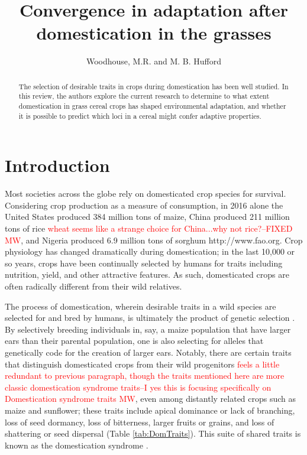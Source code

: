 \documentclass[12pt]{article}
\title{Convergence in adaptation after domestication in the grasses}
\author{Woodhouse, M.R. and M. B. Hufford}
\newcommand{\mbh}[1]{\textcolor{red}{\normalsize  #1}}
\begin{document}
\maketitle

\begin{abstract}
The selection of desirable traits in crops during domestication has been well studied. In this review, the authors explore the current research to determine to what extent domestication in grass cereal crops has shaped environmental adaptation, and whether it is possible to predict which loci in a cereal might confer adaptive properties.
\end{abstract}

\section*{Introduction}
Most societies across the globe rely on domesticated crop species for survival.
Considering crop production as a measure of consumption, in 2016 alone the United States produced 384 million tons of maize, China produced 211 million tons of rice \mbh{wheat seems like a strange choice for China...why not rice?--FIXED MW}, and Nigeria produced 6.9 million tons of sorghum http://www.fao.org.
Crop physiology has changed dramatically during domestication; in the last 10,000 or so years, crops have been continually selected by humans for traits including nutrition, yield, and other attractive features.
As such, domesticated crops are often radically different from their wild relatives.

The process of domestication, wherein desirable traits in a wild species are selected for and bred by humans, is ultimately the product of genetic selection \citep{Doebley2006}.
By selectively breeding individuals in, say, a maize population that have larger ears than their parental population, one is also selecting for alleles that genetically code for the creation of larger ears. 
Notably, there are certain traits that distinguish domesticated crops from their wild progenitors \mbh{feels a little redundant to previous paragraph, though the traits mentioned here are more classic domestication syndrome traits--I yes this is focusing specifically on Domestication syndrome traits MW}, even among distantly related crops such as maize and sunflower; these traits include apical dominance or lack of branching, loss of seed dormancy, loss of bitterness, larger fruits or grains, and loss of shattering or seed dispersal (Table \ref{tab:DomTraits}).
This suite of shared traits is known as the domestication syndrome \citep{Hammer1984}.
\end{document}
